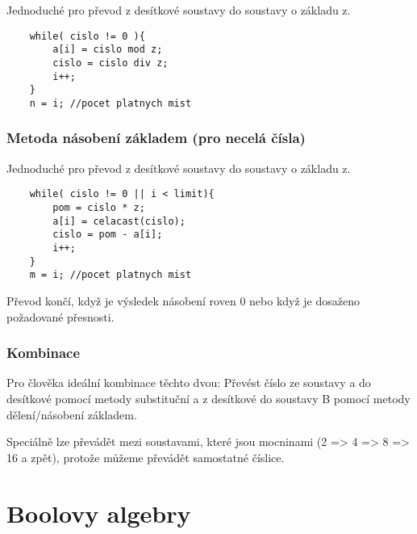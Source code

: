 \documentclass[a4wide]{report}
\begin{document}
Jednoduché pro převod z desítkové soustavy do soustavy o základu z.

\begin{lstlisting}
	while( cislo != 0 ){
		a[i] = cislo mod z;
		cislo = cislo div z;
		i++;
	}
	n = i; //pocet platnych mist
\end{lstlisting}

\subsection{Metoda násobení základem (pro necelá čísla)}

Jednoduché pro převod z desítkové soustavy do soustavy o základu z.

\begin{lstlisting}
	while( cislo != 0 || i < limit){
		pom = cislo * z;
		a[i] = celacast(cislo);
		cislo = pom - a[i];
		i++;
	}
	m = i; //pocet platnych mist
\end{lstlisting}

Převod končí, když je výsledek násobení roven 0 nebo když je dosaženo požadované přesnosti.

\subsection{Kombinace}

Pro člověka ideální kombinace těchto dvou: Převést číslo ze soustavy a do desítkové pomocí metody substituční a z desítkové do soustavy B pomocí metody dělení/násobení základem.

Speciálně lze převádět mezi soustavami, které jsou mocninami (2 => 4 => 8 => 16 a zpět), protože můžeme převádět samostatné číslice.























\setcounter{chapter}{18}
\chapter{Boolovy algebry} \label{cha:19}
\end{document}

